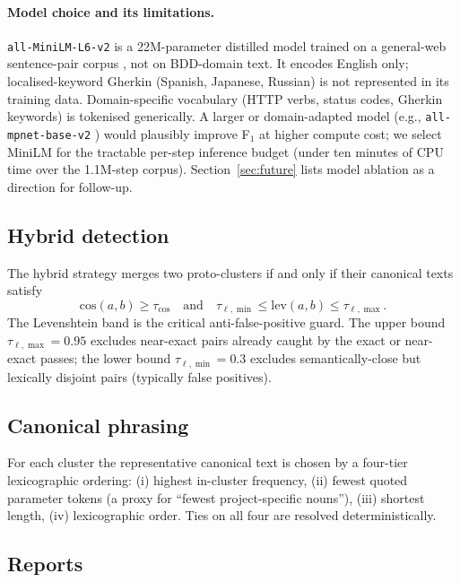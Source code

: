 \documentclass[11pt,a4paper]{article}
\begin{document}
\paragraph{Model choice and its limitations.} \texttt{all-MiniLM-L6-v2}
is a 22M-parameter distilled model trained on a general-web sentence-pair
corpus \citep{wang2020minilm}, not on BDD-domain text. It encodes
English only; localised-keyword Gherkin (Spanish, Japanese, Russian)
is not represented in its training data. Domain-specific vocabulary
(HTTP verbs, status codes, Gherkin keywords) is tokenised generically.
A larger or domain-adapted model (e.g., \texttt{all-mpnet-base-v2}
\citep{song2020mpnet}) would plausibly improve F$_1$ at higher
compute cost; we select MiniLM for the tractable per-step inference
budget (under ten minutes of CPU time over the 1.1M-step corpus).
Section~\ref{sec:future} lists model ablation as a direction for
follow-up.

\subsection{Hybrid detection}

The hybrid strategy merges two proto-clusters if and only if
their canonical texts satisfy
\begin{equation}
\mathrm{cos}(a, b) \geq \tau_{\cos} \quad \text{and} \quad
\tau_{\ell,\min} \leq \mathrm{lev}(a, b) \leq \tau_{\ell,\max}.
\end{equation}
The Levenshtein band is the critical anti-false-positive guard. The
upper bound \(\tau_{\ell,\max}=0.95\) excludes near-exact pairs
already caught by the exact or near-exact passes; the lower bound
\(\tau_{\ell,\min}=0.3\) excludes semantically-close but lexically
disjoint pairs (typically false positives).

\subsection{Canonical phrasing}

For each cluster the representative canonical text is chosen by a
four-tier lexicographic ordering: (i) highest in-cluster frequency,
(ii) fewest quoted parameter tokens (a proxy for ``fewest
project-specific nouns''), (iii) shortest length, (iv) lexicographic
order. Ties on all four are resolved deterministically.

\subsection{Reports}
\end{document}
